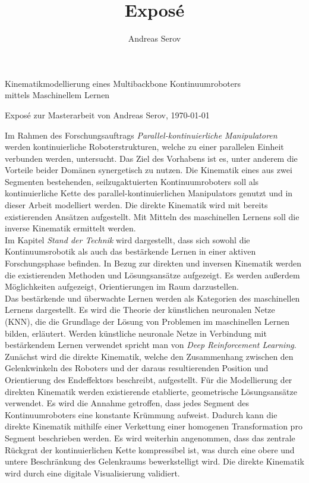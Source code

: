 \documentclass[11pt,a4paper]{article}
\author{Andreas Serov}
\title{Exposé}
\begin{document}
\begin{center}
\begin{Large}
Kinematikmodellierung eines Multibackbone Kontinuumroboters\\ mittels Maschinellem Lernen\\
\end{Large}
Exposé zur Masterarbeit von Andreas Serov, \today
\end{center}
Im Rahmen des Forschungsauftrags \textit{Parallel-kontinuierliche Manipulatoren} werden kontinuierliche Roboterstrukturen, welche zu einer parallelen Einheit verbunden werden, untersucht. Das Ziel des Vorhabens ist es, unter anderem die Vorteile beider Domänen synergetisch zu nutzen. 
Die Kinematik eines aus zwei Segmenten bestehenden, seilzugaktuierten Kontinuumroboters soll als kontinuierliche Kette des parallel-kontinuierlichen Manipulators genutzt und in dieser Arbeit modelliert werden. Die direkte Kinematik wird mit bereits existierenden Ansätzen aufgestellt. Mit Mitteln des maschinellen Lernens soll die inverse Kinematik ermittelt werden.\\

Im Kapitel \textit{Stand der Technik} wird dargestellt, dass sich sowohl die Kontinuumsrobotik als auch das bestärkende Lernen in einer aktiven Forschungsphase befinden. In Bezug zur direkten und inversen Kinematik werden die existierenden Methoden und Lösungsansätze aufgezeigt. Es werden außerdem Möglichkeiten aufgezeigt, Orientierungen im Raum darzustellen. \\
Das bestärkende und überwachte Lernen werden als Kategorien des maschinellen Lernens dargestellt. Es wird die Theorie der künstlichen neuronalen Netze (KNN), die die Grundlage der Lösung von Problemen im maschinellen Lernen bilden, erläutert. Werden künstliche neuronale Netze in Verbindung mit bestärkendem Lernen verwendet spricht man von \textit{Deep Reinforcement Learning}.\\

Zunächst wird die direkte Kinematik, welche den Zusammenhang zwischen den Gelenkwinkeln des Roboters und der daraus resultierenden Position und Orientierung des Endeffektors beschreibt, aufgestellt. Für die Modellierung der direkten Kinematik werden existierende etablierte, geometrische Lösungsansätze verwendet. Es wird die Annahme getroffen, dass jedes Segment des Kontinuumroboters eine konstante Krümmung aufweist. Dadurch kann die direkte Kinematik mithilfe einer Verkettung einer homogenen Transformation pro Segment beschrieben werden. Es wird weiterhin angenommen, dass das zentrale Rückgrat der kontinuierlichen Kette kompressibel ist, was durch eine obere und untere Beschränkung des Gelenkraums bewerkstelligt wird. Die direkte Kinematik wird durch eine digitale Visualisierung validiert. \\
\end{document}
